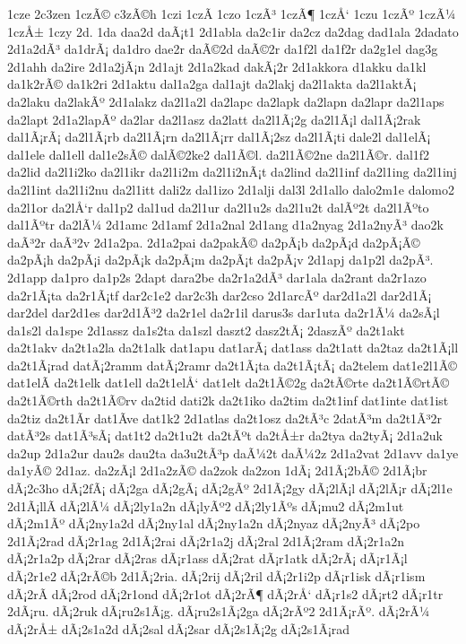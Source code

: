 {1cze
2c3zen
1czÃ©
c3zÃ©h
1czi
1czÃ­
1czo
1czÃ³
1czÃ¶
1czÅ‘
1czu
1czÃº
1czÃ¼
1czÅ±
1czy
2d.
1da
daa2d
daÃ¡t1
2d1abla
da2c1ir
da2cz
da2dag
dad1ala
2dadato
2d1a2dÃ³
da1drÃ¡
da1dro
dae2r
daÃ©2d
daÃ©2r
da1f2l
da1f2r
da2g1el
dag3g
2d1ahh
da2ire
2d1a2jÃ¡n
2d1ajt
2d1a2kad
dakÃ¡2r
2d1akkora
d1akku
da1kl
da1k2rÃ©
da1k2ri
2d1aktu
dal1a2ga
dal1ajt
da2lakj
da2l1akta
da2l1aktÃ¡
da2laku
da2lakÃº
2d1alakz
da2l1a2l
da2lapc
da2lapk
da2lapn
da2lapr
da2l1aps
da2lapt
2d1a2lapÃº
da2lar
da2l1asz
da2latt
da2l1Ã¡2g
da2l1Ã¡l
dal1Ã¡2rak
dal1Ã¡rÃ¡
da2l1Ã¡rb
da2l1Ã¡rn
da2l1Ã¡rr
dal1Ã¡2sz
da2l1Ã¡ti
dale2l
dal1elÃ¡
dal1ele
dal1ell
dal1e2sÃ©
dalÃ©2ke2
dal1Ã©l.
da2l1Ã©2ne
da2l1Ã©r.
dal1f2
da2lid
da2l1i2ko
da2l1ikr
da2l1i2m
da2l1i2nÃ¡t
da2lind
da2l1inf
da2l1ing
da2l1inj
da2l1int
da2l1i2nu
da2l1itt
dali2z
dal1izo
2d1alji
dal3l
2d1allo
dalo2m1e
dalomo2
da2l1or
da2lÅ‘r
dal1p2
dal1ud
da2l1ur
da2l1u2s
da2l1u2t
dalÃº2t
da2l1Ãºto
dal1Ãºtr
da2lÃ¼
2d1amc
2d1amf
2d1a2nal
2d1ang
d1a2nyag
2d1a2nyÃ³
dao2k
daÃ³2r
daÃ³2v
2d1a2pa.
2d1a2pai
da2pakÃ©
da2pÃ¡b
da2pÃ¡d
da2pÃ¡Ã©
da2pÃ¡h
da2pÃ¡i
da2pÃ¡k
da2pÃ¡m
da2pÃ¡t
da2pÃ¡v
2d1apj
da1p2l
da2pÃ³.
2d1app
da1pro
da1p2s
2dapt
dara2be
da2r1a2dÃ³
dar1ala
da2rant
da2r1azo
da2r1Ã¡ta
da2r1Ã¡tf
dar2c1e2
dar2c3h
dar2cso
2d1arcÃº
dar2d1a2l
dar2d1Ã¡
dar2del
dar2d1es
dar2d1Ã³2
da2r1el
da2r1il
darus3s
dar1uta
da2r1Ã¼
da2sÃ¡l
da1s2l
da1spe
2d1assz
da1s2ta
da1szl
daszt2
dasz2tÃ¡
2daszÃº
da2t1akt
da2t1akv
da2t1a2la
da2t1alk
dat1apu
dat1arÃ¡
dat1ass
da2t1att
da2taz
da2t1Ã¡ll
da2t1Ã¡rad
datÃ¡2ramm
datÃ¡2ramr
da2t1Ã¡ta
da2t1Ã¡tÃ¡
da2telem
dat1e2l1Ã©
dat1elÃ­
da2t1elk
dat1ell
da2t1elÅ‘
dat1elt
da2t1Ã©2g
da2tÃ©rte
da2t1Ã©rtÃ©
da2t1Ã©rth
da2t1Ã©rv
da2tid
dati2k
da2t1iko
da2tim
da2t1inf
dat1inte
dat1ist
da2tiz
da2t1Ã­r
dat1Ã­ve
dat1k2
2d1atlas
da2t1osz
da2tÃ³c
2datÃ³m
da2t1Ã³2r
datÃ³2s
dat1Ã³sÃ¡
dat1t2
da2t1u2t
da2tÃºt
da2tÅ±r
da2tya
da2tyÃ¡
2d1a2uk
da2up
2d1a2ur
dau2s
dau2ta
da3u2tÃ³p
daÃ¼2t
daÃ¼2z
2d1a2vat
2d1avv
da1ye
da1yÃ©
2d1az.
da2zÃ¡l
2d1a2zÃ©
da2zok
da2zon
1dÃ¡
2d1Ã¡2bÃ©
2d1Ã¡br
dÃ¡2c3ho
dÃ¡2fÃ¡
dÃ¡2ga
dÃ¡2gÃ¡
dÃ¡2gÃº
2d1Ã¡2gy
dÃ¡2lÃ¡l
dÃ¡2lÃ¡r
dÃ¡2l1e
2d1Ã¡llÃ­
dÃ¡2lÃ¼
dÃ¡2ly1a2n
dÃ¡lyÃº2
dÃ¡2ly1Ãºs
dÃ¡mu2
dÃ¡2m1ut
dÃ¡2m1Ãº
dÃ¡2ny1a2d
dÃ¡2ny1al
dÃ¡2ny1a2n
dÃ¡2nyaz
dÃ¡2nyÃ³
dÃ¡2po
2d1Ã¡2rad
dÃ¡2r1ag
2d1Ã¡2rai
dÃ¡2r1a2j
dÃ¡2ral
2d1Ã¡2ram
dÃ¡2r1a2n
dÃ¡2r1a2p
dÃ¡2rar
dÃ¡2ras
dÃ¡r1ass
dÃ¡2rat
dÃ¡r1atk
dÃ¡2rÃ¡
dÃ¡r1Ã¡l
dÃ¡2r1e2
dÃ¡2rÃ©b
2d1Ã¡2ria.
dÃ¡2rij
dÃ¡2ril
dÃ¡2r1i2p
dÃ¡r1isk
dÃ¡r1ism
dÃ¡2rÃ­
dÃ¡2rod
dÃ¡2r1ond
dÃ¡2r1ot
dÃ¡2rÃ¶
dÃ¡2rÅ‘
dÃ¡r1s2
dÃ¡rt2
dÃ¡r1tr
2dÃ¡ru.
dÃ¡2ruk
dÃ¡ru2s1Ã¡g.
dÃ¡ru2s1Ã¡2ga
dÃ¡2rÃº2
2d1Ã¡rÃº.
dÃ¡2rÃ¼
dÃ¡2rÅ±
dÃ¡2s1a2d
dÃ¡2sal
dÃ¡2sar
dÃ¡2s1Ã¡2g
dÃ¡2s1Ã¡rad
}
